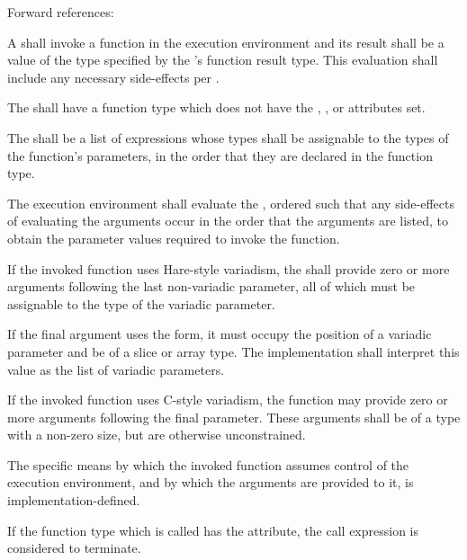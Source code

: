 Forward references: 

\specsubsubitem
A  shall invoke a function in the execution
environment and its result shall be a value of the type specified by the
's function result type. This evaluation shall
include any necessary side-effects per .

\specsubsubitem
The  shall have a function type which does not
have the , , or  attributes set.

\specsubsubitem
The  shall be a list of expressions whose types
shall be assignable to the types of the function's parameters, in the order
that they are declared in the function type.

\specsubsubitem
The execution environment shall evaluate the ,
ordered such that any side-effects of evaluating the arguments occur in the
order that the arguments are listed, to obtain the parameter values required to
invoke the function.

\specsubsubitem
If the invoked function uses Hare-style variadism, the
 shall provide zero or more arguments following the
last non-variadic parameter, all of which must be assignable to the type of the
variadic parameter.

\specsubsubitem
If the final argument uses the  form, it must occupy the position of a
variadic parameter and be of a slice or array type. The implementation shall
interpret this value as the list of variadic parameters.

\specsubsubitem
If the invoked function uses C-style variadism, the function may provide zero
or more arguments following the final parameter. These arguments shall be of a
type with a non-zero size, but are otherwise unconstrained.

\specsubsubitem
The specific means by which the invoked function assumes control of the
execution environment, and by which the arguments are provided to it, is
implementation-defined.


\specsubsubitem
If the function type which is called has the  attribute,
the call expression is considered to terminate.

